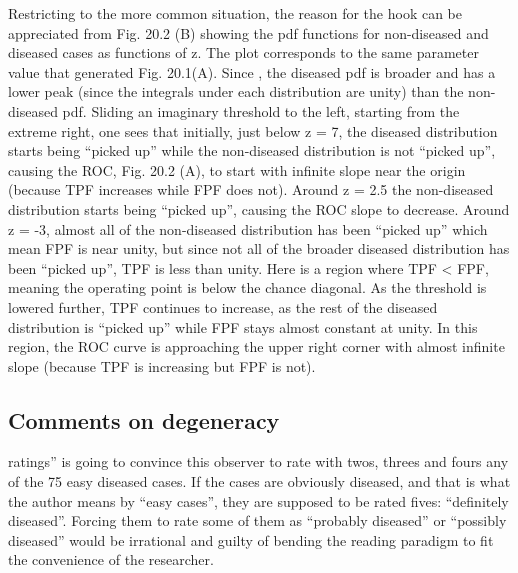 \documentclass[
]{book}
\begin{document}
Restricting to the more common situation, the reason for the hook can be appreciated from Fig. 20.2 (B) showing the pdf functions for non-diseased and diseased cases as functions of z. The plot corresponds to the same parameter value that generated Fig. 20.1(A). Since , the diseased pdf is broader and has a lower peak (since the integrals under each distribution are unity) than the non-diseased pdf. Sliding an imaginary threshold to the left, starting from the extreme right, one sees that initially, just below z = 7, the diseased distribution starts being ``picked up'' while the non-diseased distribution is not ``picked up'', causing the ROC, Fig. 20.2 (A), to start with infinite slope near the origin (because TPF increases while FPF does not). Around z = 2.5 the non-diseased distribution starts being ``picked up'', causing the ROC slope to decrease. Around z = -3, almost all of the non-diseased distribution has been ``picked up'' which mean FPF is near unity, but since not all of the broader diseased distribution has been ``picked up'', TPF is less than unity. Here is a region where TPF \textless{} FPF, meaning the operating point is below the chance diagonal. As the threshold is lowered further, TPF continues to increase, as the rest of the diseased distribution is ``picked up'' while FPF stays almost constant at unity. In this region, the ROC curve is approaching the upper right corner with almost infinite slope (because TPF is increasing but FPF is not).

\hypertarget{comments-on-degeneracy}{%
\subsection{Comments on degeneracy}\label{comments-on-degeneracy}}

ratings'' is going to convince this observer to rate with twos, threes and fours any of the 75 easy diseased cases. If the cases are obviously diseased, and that is what the author means by ``easy cases'', they are supposed to be rated fives: ``definitely diseased''. Forcing them to rate some of them as ``probably diseased'' or ``possibly diseased'' would be irrational and guilty of bending the reading paradigm to fit the convenience of the researcher.
\end{document}
